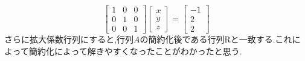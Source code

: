 \begin{equation}\label{eq:solableByRREF}
\begin{bmatrix}
    1& 0 & 0 \\
    0 & 1 & 0 \\
    0 & 0 & 1 
\end{bmatrix}
\begin{bmatrix}
    x \\ y \\ z
\end{bmatrix}
=
\begin{bmatrix}
    −1 \\ 2 \\ 2
\end{bmatrix}
\end{equation}
さらに拡大係数行列にすると,行列$A$の簡約化後である行列Rと一致する.これによって簡約化によって解きやすくなったことがわかったと思う.

